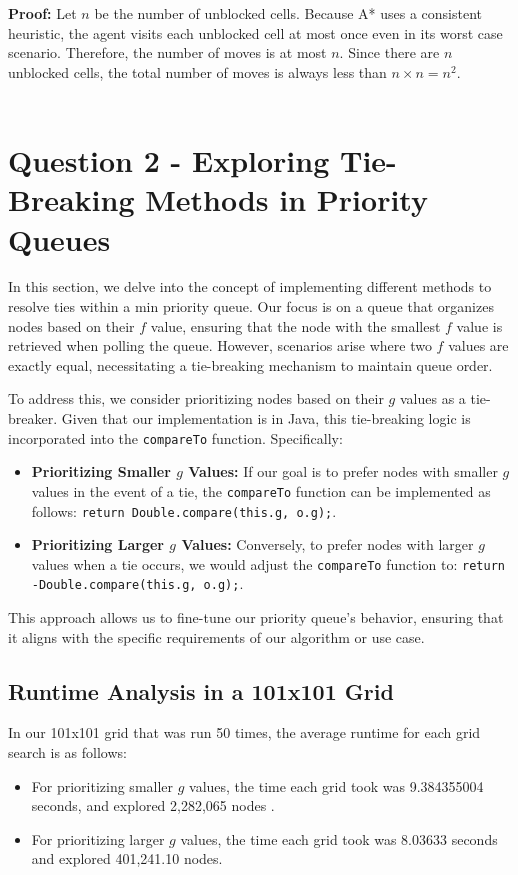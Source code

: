 \documentclass{article}
\begin{document}
\textbf{Proof:} Let $n$ be the number of unblocked cells. Because A* uses a consistent heuristic, the agent visits each unblocked cell at most once even in its worst case scenario. Therefore, the number of moves is at most $n$. Since there are $n$ unblocked cells, the total number of moves is always less than $n \times n = n^2$. 
\\ 
\\

\section{Question 2 - Exploring Tie-Breaking Methods in Priority Queues}

In this section, we delve into the concept of implementing different methods to resolve ties within a min priority queue. Our focus is on a queue that organizes nodes based on their $f$ value, ensuring that the node with the smallest $f$ value is retrieved when polling the queue. However, scenarios arise where two $f$ values are exactly equal, necessitating a tie-breaking mechanism to maintain queue order.

To address this, we consider prioritizing nodes based on their $g$ values as a tie-breaker. Given that our implementation is in Java, this tie-breaking logic is incorporated into the \texttt{compareTo} function. Specifically:

\begin{itemize}
    \item \textbf{Prioritizing Smaller $g$ Values:} If our goal is to prefer nodes with smaller $g$ values in the event of a tie, the \texttt{compareTo} function can be implemented as follows: \texttt{return Double.compare(this.g, o.g);}.
    \item \textbf{Prioritizing Larger $g$ Values:} Conversely, to prefer nodes with larger $g$ values when a tie occurs, we would adjust the \texttt{compareTo} function to: \texttt{return -Double.compare(this.g, o.g);}.
\end{itemize}

This approach allows us to fine-tune our priority queue's behavior, ensuring that it aligns with the specific requirements of our algorithm or use case.

\subsection{Runtime Analysis in a 101x101 Grid}
In our 101x101 grid that was run 50 times, the average runtime for each grid search is as follows:
\begin{itemize}
    \item For prioritizing smaller $g$ values, the time each grid took was 9.384355004 seconds, and explored 2,282,065 nodes .
    \item For prioritizing larger $g$ values, the time each grid took was 8.03633 seconds and explored 401,241.10 nodes.
\end{itemize}
\end{document}

